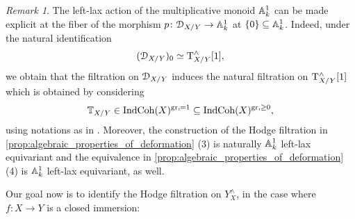 \documentclass[10pt,a4paper,reqno]{amsart} %
\theoremstyle{plain}
\theoremstyle{definition}
\theoremstyle{remark}
\newtheorem{rem}[thm]{Remark}
\numberwithin{equation}{section}
\begin{document}
\begin{rem}
    The left-lax action of the multiplicative monoid $\mathbb A^1_k$ can be made explicit at the fiber of the morphism $p \colon \mathcal D_{X/ Y} \to \mathbb A^1_k$
    at $\{ 0\} \subseteq \mathbb A^1_k$. Indeed, under the natural identification
        \[
            (\mathcal D_{X/ Y})_0 \simeq \mathrm T_{X/ Y}^\wedge[1] ,
        \]
    we obtain that the filtration on $\mathcal D_{X/ Y}$ induces the natural filtration on $\mathrm T_{X/ Y}^\wedge[1]$ which is obtained by considering
        \[
            \mathbb T_{X/ Y}  \in \mathrm{Ind}\mathrm{Coh}(X)^{\mathrm{gr}, =1} \subseteq \mathrm{Ind}\mathrm{Coh}(X)^{\mathrm{gr}, \ge 0},
        \]
    using notations as in \cite[\S 9.2.5.2]{Gaitsgory_Study_II}. Moreover, the construction of the Hodge filtration in \cref{prop:algebraic_properties_of_deformation} (3)
    is naturally $\mathbb A^1_k$ left-lax equivariant and the equivalence in \cref{prop:algebraic_properties_of_deformation} (4) is $\mathbb A^1_k$ left-lax equivariant, as well.
\end{rem}

Our goal now is to identify the Hodge filtration on $Y^\wedge_X$, in the case where $f \colon X \to Y$ is a closed immersion:
\end{document}
